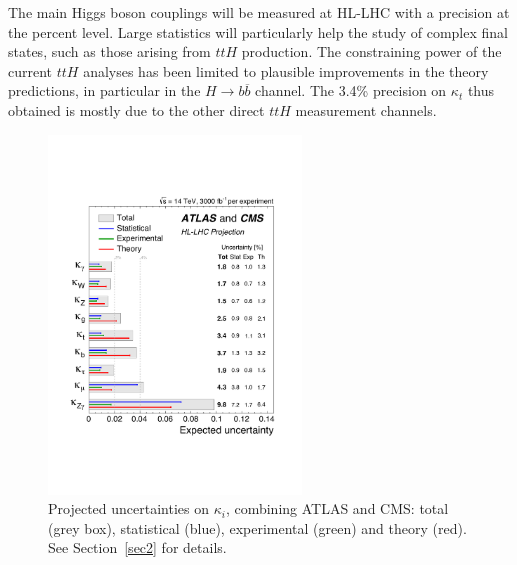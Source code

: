 \documentclass[../report.tex]{subfiles}
\begin{document}
The main Higgs boson couplings will be measured at HL-LHC with a precision at the percent level. Large statistics will particularly help the study of complex final states, such as those arising from $ttH$ production. 
The constraining power of the current $ttH$ analyses has been limited to plausible improvements in the theory predictions, in particular in the $H\rightarrow b\overline{b}$ channel. The 3.4\% precision on $\kappa_t$ thus obtained is mostly due to the other direct $ttH$ measurement channels.

\begin{figure}
\begin{center}
\includegraphics[width=0.60\textwidth,trim=1.3cm 3.3cm 1.3cm 5cm,clip]{section10/img/Kappas}
\caption{Projected  uncertainties on $\kappa_i$, combining ATLAS and CMS: total (grey box), statistical (blue), experimental (green) and theory (red). See Section~\ref{sec2} for details.
\label{fig:HiggsCouplings}
}
\end{center}
\end{figure}
\end{document}
